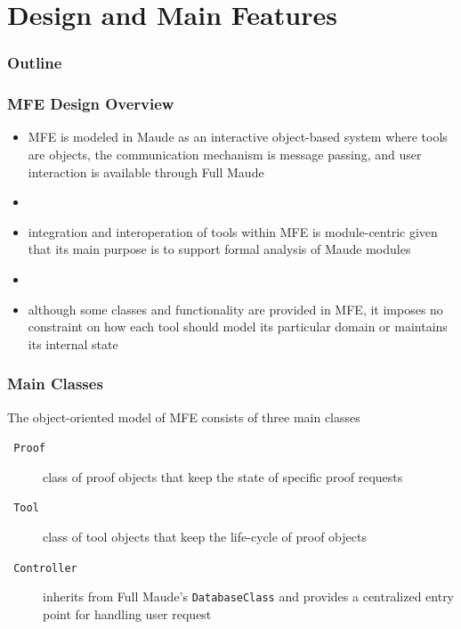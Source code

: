 \documentclass{beamer}
\begin{document}
\section{Design and Main Features}

\begin{frame}
  \frametitle{Outline}
  \tableofcontents[currentsection]
\end{frame}

\begin{frame}
  \frametitle{MFE Design Overview}

  \begin{itemize}
    \item MFE is modeled in Maude as an interactive object-based system where
      tools are objects, the communication mechanism is message passing, and
      user interaction is available through Full Maude
    \item[]
    \item<2-> integration and interoperation of tools within MFE is module-centric
      given that its main purpose is to support formal analysis of Maude modules
    \item[]
    \item<3-> although some classes and functionality are provided in MFE, it imposes
      no constraint on how each tool should model its particular domain or maintains
      its internal state
  \end{itemize}
\end{frame}

\begin{frame}
  \frametitle{Main Classes}

  The object-oriented model of MFE consists of three main classes

  \begin{description}
    \item[\texttt{  \small Proof}] class of proof objects that keep the state of specific proof requests
    \item[\texttt{  \small Tool}] class of tool objects that keep the life-cycle of proof objects
    \item[\texttt{  \small Controller}] inherits from Full Maude's {\tt DatabaseClass} and
      provides a centralized entry point for handling user request
  \end{description}
\end{frame}
\end{document}
